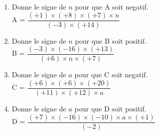 \begin{exercice*}    
        \begin{enumerate}
            \item Donne le signe de $ n $ pour que A soit negatif. \\
            A = $ \dfrac {(+1)\times (+8)\times (+7)\times n}{(-3)\times (+14)} $ 
            \item Donne le signe de $ n $ pour que B soit positif. \\
            B = $ \dfrac {(-3)\times (-16)\times (+13)}{(+6)\times n\times (+7)} $ 
            \item Donne le signe de $ a $ pour que C soit negatif. \\
            C = $ \dfrac {(+6)\times (+6)\times (+20)}{(+11)\times (+12)\times a} $ 
            \item Donne le signe de $ a $ pour que D soit positif. \\
            D = $ \dfrac {(+7)\times (-16)\times (-10)\times a\times (+1)}{(-2)} $ 
        \end{enumerate}
    
\end{exercice*}
